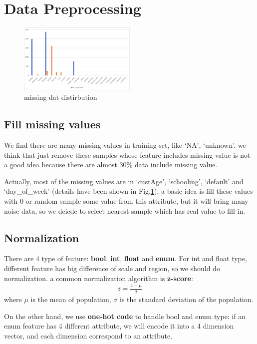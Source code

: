 \section{Data Preprocessing}

\begin{figure}[ht]
    \centering
    \includegraphics[width=0.5\textwidth]{img/missing.pdf}
    \caption{missing dat distirbution}
    \label{missing}
\end{figure}

\subsection{Fill missing values}
We find there are many missing values in training set, like `NA', `unknown'. we think that just remove these samples whose feature includes missing value is not a good idea because there are almost 30\% data include missing value.

Actually, most of the missing values are in `custAge', `schooling', `default' and `day\_of\_week' (details have been shown in Fig.\ref{missing}), a basic idea is fill these values with 0 or random sample some value from this attribute, but it will bring many noise data, so we deicde to select nearest sample which has real value to fill in.

\subsection{Normalization}
There are 4 type of feature: \textbf{bool}, \textbf{int}, \textbf{float} and \textbf{enum}. For int and float type, different feature has big difference of scale and region, so we should do normalization. a common normalization algorithm is \textbf{z-score}:
\begin{align*}
    z = \frac{z - \mu}{\sigma}
\end{align*}
where $\mu$ is the mean of population, $\sigma$ is the standard deviation of the population.



On the other hand, we use \textbf{one-hot code} to handle bool and enum type: if an enum feature has 4 different attribute, we will encode it into a 4 dimension vector, and each dimension correspond to an attribute.


